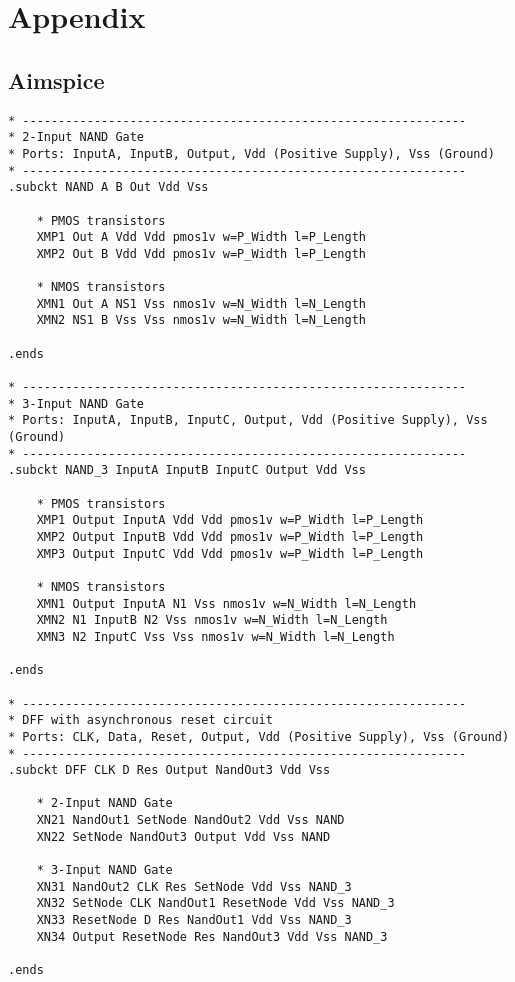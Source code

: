 \section{Appendix}
\subsection{Aimspice}

\begin{lstlisting}
* --------------------------------------------------------------
* 2-Input NAND Gate
* Ports: InputA, InputB, Output, Vdd (Positive Supply), Vss (Ground)
* --------------------------------------------------------------
.subckt NAND A B Out Vdd Vss

    * PMOS transistors
    XMP1 Out A Vdd Vdd pmos1v w=P_Width l=P_Length 
    XMP2 Out B Vdd Vdd pmos1v w=P_Width l=P_Length 

    * NMOS transistors
    XMN1 Out A NS1 Vss nmos1v w=N_Width l=N_Length 
    XMN2 NS1 B Vss Vss nmos1v w=N_Width l=N_Length 

.ends

* --------------------------------------------------------------
* 3-Input NAND Gate
* Ports: InputA, InputB, InputC, Output, Vdd (Positive Supply), Vss (Ground)
* --------------------------------------------------------------
.subckt NAND_3 InputA InputB InputC Output Vdd Vss

    * PMOS transistors
    XMP1 Output InputA Vdd Vdd pmos1v w=P_Width l=P_Length 
    XMP2 Output InputB Vdd Vdd pmos1v w=P_Width l=P_Length
    XMP3 Output InputC Vdd Vdd pmos1v w=P_Width l=P_Length

    * NMOS transistors
    XMN1 Output InputA N1 Vss nmos1v w=N_Width l=N_Length 
    XMN2 N1 InputB N2 Vss nmos1v w=N_Width l=N_Length
    XMN3 N2 InputC Vss Vss nmos1v w=N_Width l=N_Length  

.ends

* --------------------------------------------------------------
* DFF with asynchronous reset circuit
* Ports: CLK, Data, Reset, Output, Vdd (Positive Supply), Vss (Ground)
* --------------------------------------------------------------
.subckt DFF CLK D Res Output NandOut3 Vdd Vss

    * 2-Input NAND Gate
    XN21 NandOut1 SetNode NandOut2 Vdd Vss NAND
    XN22 SetNode NandOut3 Output Vdd Vss NAND

    * 3-Input NAND Gate
    XN31 NandOut2 CLK Res SetNode Vdd Vss NAND_3 
    XN32 SetNode CLK NandOut1 ResetNode Vdd Vss NAND_3 
    XN33 ResetNode D Res NandOut1 Vdd Vss NAND_3 
    XN34 Output ResetNode Res NandOut3 Vdd Vss NAND_3 

.ends
\end{lstlisting}

